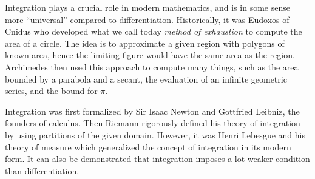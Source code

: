 \label{part:measure}

Integration plays a crucial role in modern mathematics,
and is in some sense more ``universal'' compared to differentiation.
Historically, it was Eudoxos of Cnidus
who developed what we call today \emph{method of exhaustion}
to compute the area of a circle.
The idea is to approximate a given region with polygons of known area,
hence the limiting figure would have the same area as the region.
Archimedes then used this approach to compute many things, such as
the area bounded by a parabola and a secant,
the evaluation of an infinite geometric series,
and the bound for \(\pi\).

Integration was first formalized by
Sir Isaac Newton and Gottfried Leibniz, the founders of calculus.
Then Riemann rigorously defined his theory of integration
by using partitions of the given domain.
However, it was Henri Lebesgue and his theory of measure
which generalized the concept of integration in its modern form.
It can also be demonstrated that
integration imposes a lot weaker condition than differentiation.
